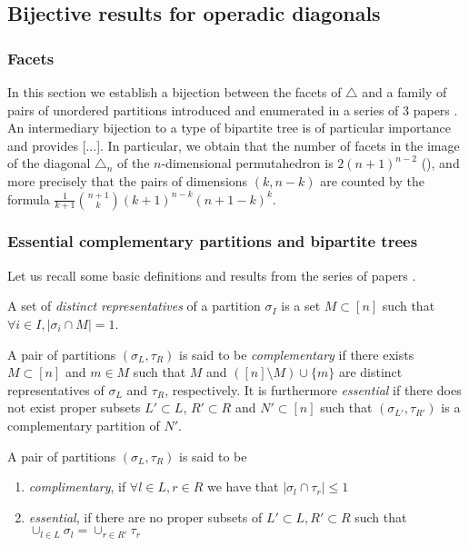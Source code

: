 \subsection{Bijective results for operadic diagonals}
\label{s:vertices}

\subsubsection{Facets}

In this section we establish a bijection between the facets of $\triangle$ and a family of pairs of unordered partitions introduced and enumerated in a series of 3 papers \cite{chen1969computer,chen1971tables,kajitani1982number}. An intermediary bijection to a type of bipartite tree is of particular importance and provides [...].
In particular, we obtain that the number of facets in the image of the diagonal $\triangle_n$ of the $n$-dimensional permutahedron is $2(n+1)^{n-2}$ (), and more precisely that the pairs of dimensions $(k,n-k)$ are counted by the formula $\frac{1}{k+1}\binom{n+1}{k}(k+1)^{n-k}(n+1-k)^{k}$. 


\subsubsection{Essential complementary partitions and bipartite trees}
Let us recall some basic definitions and results from the series of papers \cite{chen1969computer,chen1971tables,kajitani1982number}.

\begin{definition}
A set of \emph{distinct representatives} of a partition $\sigma_I$ is a set $M\subset [n]$ such that $\forall i \in I,|\sigma_i \cap M| = 1$.
\end{definition}

\begin{definition}
A pair of partitions $(\sigma_L,\tau_R)$ is said to be \emph{complementary} if there exists $M\subset [n]$ and $m \in M$ such that $M$ and $([n]\setminus M) \cup \{m\}$ are distinct representatives of $\sigma_L$ and $\tau_R$, respectively.
It is furthermore \emph{essential} if there does not exist proper subsets $ L'\subset L$, $R'\subset R$ and $N' \subset [n]$ such that $(\sigma_{L'},\tau_{R'})$ is a complementary partition of $N'$.
\end{definition}
\begin{definition}
A pair of partitions $(\sigma_L,\tau_R)$ is said to be 
\begin{enumerate}
	\item \emph{complimentary}, if $\forall l\in L, r\in R$ we have that $|\sigma_l \cap \tau_r| \leq 1$
	\item \emph{essential}, if there are no proper subsets of $L'\subset L,R'\subset R$ such that $\cup_{l \in L} \sigma_l = \cup_{r \in R'} \tau_r$
\end{enumerate}	

\end{definition}

